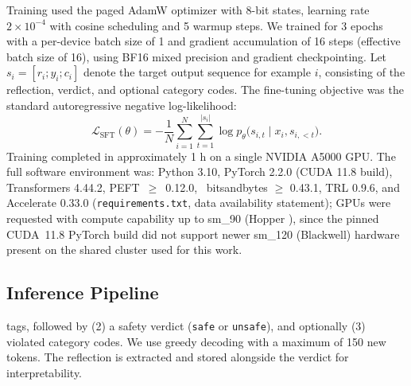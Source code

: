 \documentclass[superintelligence,article,accept,moreauthors]{Definitions/mdpi}
\renewcommand{\hl}[1]{#1}
\begin{document}
Training used the paged AdamW optimizer with 8-bit states, learning rate $2 \times 10^{-4}$ with cosine scheduling and 5 warmup steps. We trained for 3 epochs with a per-device batch size of 1 and gradient accumulation of 16 steps (effective batch size of 16), using BF16 mixed precision and gradient checkpointing. Let $s_i = [r_i; y_i; c_i]$ denote the target output sequence for example $i$, consisting of the reflection, verdict, and optional category codes. The fine-tuning objective was the standard autoregressive negative log-likelihood:
\begin{equation}
  \mathcal{L}_{\text{SFT}}(\theta) = - \frac{1}{N} \sum_{i=1}^{N} \sum_{t=1}^{|s_i|}
  \log p_{\theta}\bigl(s_{i,t} \mid x_i, s_{i,<t}\bigr).
\end{equation}
Training completed in approximately 1 h on a single NVIDIA A5000 GPU. The full software environment was: Python 3.10, PyTorch 2.2.0 (CUDA 11.8 build), Transformers 4.44.2, \mbox{PEFT $\geq$\hl{ 0.12.0,} %
} bitsandbytes $\geq$ \hl{0.43.1}, TRL 0.9.6, and Accelerate 0.33.0 (\texttt{requirements.txt}, data availability statement); GPUs were requested with compute capability up to sm\_90 (\hl{Hopper}%
), since the pinned CUDA~11.8 PyTorch build did not support newer sm\_120 (\hl{Blackwell}) hardware present on the shared cluster used for this work.

\subsection{Inference Pipeline}

 tags, followed by (2) a safety verdict (\texttt{safe} or \texttt{unsafe}), and optionally (3) violated category codes. We use greedy decoding with a maximum of 150 new tokens. The reflection is extracted and stored alongside the verdict for interpretability.
\end{document}

